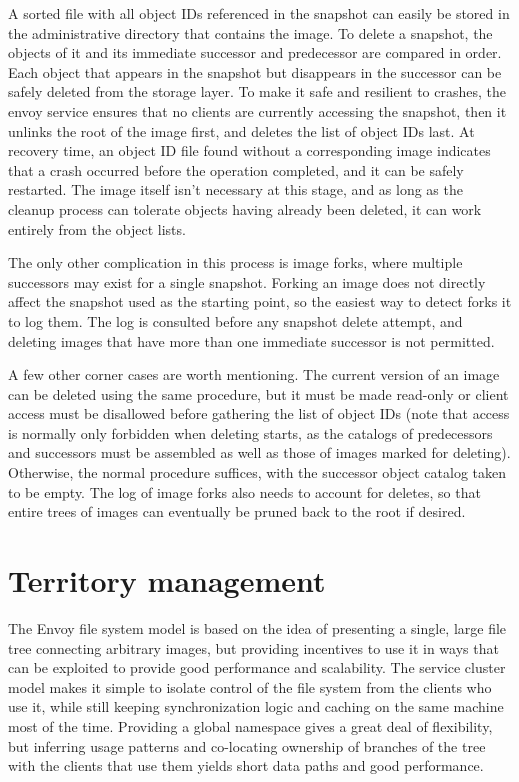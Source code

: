 A sorted file with all object IDs referenced in the snapshot can easily be stored in the administrative directory that contains the image. To delete a snapshot, the objects of it and its immediate successor and predecessor are compared in order. Each object that appears in the snapshot but disappears in the successor can be safely deleted from the storage layer. To make it safe and resilient to crashes, the envoy service ensures that no clients are currently accessing the snapshot, then it unlinks the root of the image first, and deletes the list of object IDs last. At recovery time, an object ID file found without a corresponding image indicates that a crash occurred before the operation completed, and it can be safely restarted. The image itself isn't necessary at this stage, and as long as the cleanup process can tolerate objects having already been deleted, it can work entirely from the object lists.

The only other complication in this process is image forks, where multiple successors may exist for a single snapshot. Forking an image does not directly affect the snapshot used as the starting point, so the easiest way to detect forks it to log them. The log is consulted before any snapshot delete attempt, and deleting images that have more than one immediate successor is not permitted.

A few other corner cases are worth mentioning. The current version of an image can be deleted using the same procedure, but it must be made read-only or client access must be disallowed before gathering the list of object IDs (note that access is normally only forbidden when deleting starts, as the catalogs of predecessors and successors must be assembled as well as those of images marked for deleting). Otherwise, the normal procedure suffices, with the successor object catalog taken to be empty. The log of image forks also needs to account for deletes, so that entire trees of images can eventually be pruned back to the root if desired.

\section{Territory management}

The Envoy file system model is based on the idea of presenting a single, large file tree connecting arbitrary images, but providing incentives to use it in ways that can be exploited to provide good performance and scalability. The service cluster model makes it simple to isolate control of the file system from the clients who use it, while still keeping synchronization logic and caching on the same machine most of the time. Providing a global namespace gives a great deal of flexibility, but inferring usage patterns and co-locating ownership of branches of the tree with the clients that use them yields short data paths and good performance.

